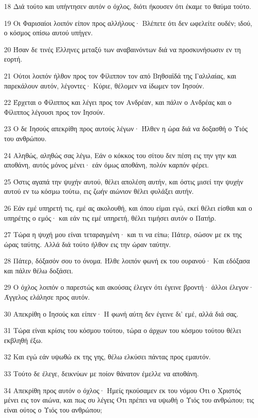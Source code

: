 \par 18 Διά τούτο και υπήντησεν αυτόν ο όχλος, διότι ήκουσεν ότι έκαμε το θαύμα τούτο.
\par 19 Οι Φαρισαίοι λοιπόν είπον προς αλλήλους· Βλέπετε ότι δεν ωφελείτε ουδέν; ιδού, ο κόσμος οπίσω αυτού υπήγεν.
\par 20 Ήσαν δε τινές Έλληνες μεταξύ των αναβαινόντων διά να προσκυνήσωσιν εν τη εορτή.
\par 21 Ούτοι λοιπόν ήλθον προς τον Φίλιππον τον από Βηθσαϊδά της Γαλιλαίας, και παρεκάλουν αυτόν, λέγοντες· Κύριε, θέλομεν να ίδωμεν τον Ιησούν.
\par 22 Έρχεται ο Φίλιππος και λέγει προς τον Ανδρέαν, και πάλιν ο Ανδρέας και ο Φίλιππος λέγουσι προς τον Ιησούν.
\par 23 Ο δε Ιησούς απεκρίθη προς αυτούς λέγων· Ήλθεν η ώρα διά να δοξασθή ο Υιός του ανθρώπου.
\par 24 Αληθώς, αληθώς σας λέγω, Εάν ο κόκκος του σίτου δεν πέση εις την γην και αποθάνη, αυτός μόνος μένει· εάν όμως αποθάνη, πολύν καρπόν φέρει.
\par 25 Όστις αγαπά την ψυχήν αυτού, θέλει απολέση αυτήν, και όστις μισεί την ψυχήν αυτού εν τω κόσμω τούτω, εις ζωήν αιώνιον θέλει φυλάξει αυτήν.
\par 26 Εάν εμέ υπηρετή τις, εμέ ας ακολουθή, και όπου είμαι εγώ, εκεί θέλει είσθαι και ο υπηρέτης ο εμός· και εάν τις εμέ υπηρετή, θέλει τιμήσει αυτόν ο Πατήρ.
\par 27 Τώρα η ψυχή μου είναι τεταραγμένη· και τι να είπω; Πάτερ, σώσον με εκ της ώρας ταύτης. Αλλά διά τούτο ήλθον εις την ώραν ταύτην.
\par 28 Πάτερ, δόξασόν σου το όνομα. Ήλθε λοιπόν φωνή εκ του ουρανού· Και εδόξασα και πάλιν θέλω δοξάσει.
\par 29 Ο όχλος λοιπόν ο παρεστώς και ακούσας έλεγεν ότι έγεινε βροντή· άλλοι έλεγον· Άγγελος ελάλησε προς αυτόν.
\par 30 Απεκρίθη ο Ιησούς και είπεν· Η φωνή αύτη δεν έγεινε δι' εμέ, αλλά διά σας.
\par 31 Τώρα είναι κρίσις του κόσμου τούτου, τώρα ο άρχων του κόσμου τούτου θέλει εκβληθή έξω.
\par 32 Και εγώ εάν υψωθώ εκ της γης, θέλω ελκύσει πάντας προς εμαυτόν.
\par 33 Τούτο δε έλεγε, δεικνύων με ποίον θάνατον έμελλε να αποθάνη.
\par 34 Απεκρίθη προς αυτόν ο όχλος· Ημείς ηκούσαμεν εκ του νόμου Ότι ο Χριστός μένει εις τον αιώνα, και πως συ λέγεις Ότι πρέπει να υψωθή ο Υιός του ανθρώπου; τις είναι ούτος ο Υιός του ανθρώπου;
